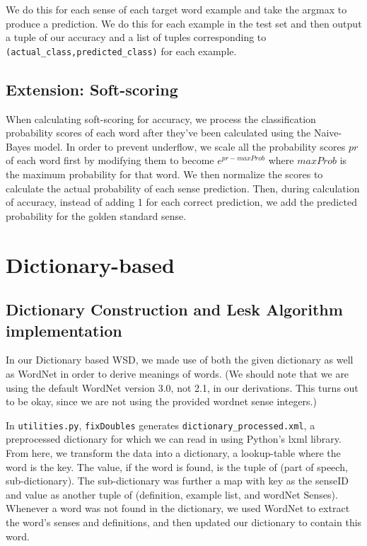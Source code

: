 \documentclass{article}
\begin{document}
We do this for each sense of each target word example and take the argmax to produce a prediction. We do this for each example in the test set and then output a tuple of our accuracy and a list of tuples corresponding to \texttt{(actual\_class,predicted\_class)} for each example. 

\subsection{Extension: Soft-scoring}
When calculating soft-scoring for accuracy, we process the classification probability scores of each word after they've been calculated using the Naive-Bayes model. In order to prevent underflow, we scale all the probability scores $pr$ of each word first by modifying them to become $e^{pr-maxProb}$ where $maxProb$ is the maximum probability for that word. We then normalize the scores to calculate the actual probability of each sense prediction. Then, during calculation of accuracy, instead of adding 1 for each correct prediction, we add the predicted probability for the golden standard sense.

\section{Dictionary-based}

\subsection{Dictionary Construction and Lesk Algorithm implementation}
In our Dictionary based WSD, we made use of both the given dictionary as well as WordNet in order to derive meanings of words. (We should note that we are using the default WordNet version 3.0, not 2.1, in our derivations. This turns out to be okay, since we are not using the provided wordnet sense integers.)

In \texttt{utilities.py}, \texttt{fixDoubles} generates \texttt{dictionary\_processed.xml}, a preprocessed dictionary for which we can read in using Python's lxml library. From here, we transform the data into a dictionary, a lookup-table where the word is the key. The value, if the word is found, is the tuple of (part of speech, sub-dictionary). The sub-dictionary was further a map with key as the senseID and value as another tuple of (definition, example list, and wordNet Senses). Whenever a word was not found in the dictionary, we used WordNet to extract the word's senses and definitions, and then updated our dictionary to contain this word.
\end{document}
